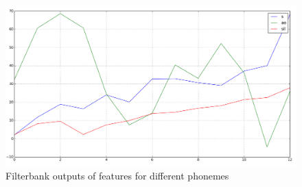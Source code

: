 \documentclass[12pt,a4paper,oneside]{article}
\begin{document}
\begin{figure}
\includegraphics[scale=0.4]{inverse_dct.png}
\caption{Filterbank outputs of features for different phonemes}
\label{fig:inv_dcts}
\end{figure}
\end{document}
